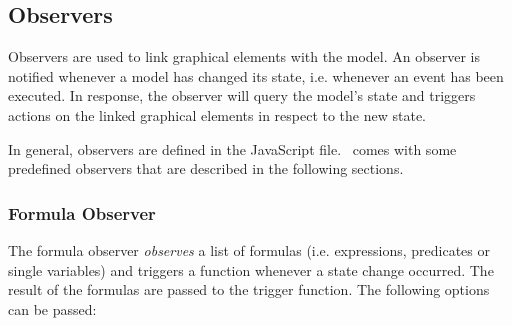 %
%

\subsection{Observers}

Observers are used to link graphical elements with the model. 
An observer is notified whenever a model has changed its state, i.e. whenever an event has been executed. 
In response, the observer will query the model's state and triggers actions on the linked graphical elements in respect to the new state. 

In general, observers are defined in the JavaScript file. 
\bms~comes with some predefined observers that are described in the following sections.

\subsubsection{Formula Observer}

The formula observer \textit{observes} a list of formulas (i.e. expressions, predicates or single variables) and triggers a function whenever a state change occurred.
The result of the formulas are passed to the trigger function.
The following options can be passed:

